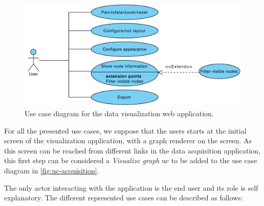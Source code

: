 \begin{figure}
  \centering
  \includegraphics[width=.8\linewidth]{images/diagrams/uc-visu}
  \caption[Use case diagram for the data visualization web application.]{Use case diagram for the data visualization web application.}
  \label{fig:uc-visu}
\end{figure}

For all the presented use cases, we suppose that the users starts at the initial screen of the visualization application, with a graph renderer on the screen. As this screen can be reached from different links in the data acquisition application, this first step can be considered a \emph{Visualize graph} \gls{uc} to be added to the use case diagram in \vref{fig:uc-acquisition}.

The only actor interacting with the application is the end user and its role is self explanatory. The different represented use cases can be described as follows:

